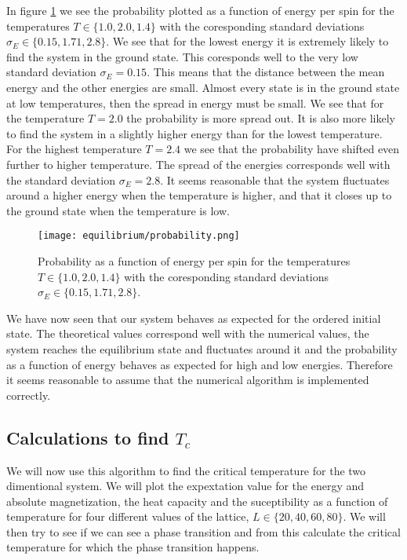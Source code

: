 \documentclass[11pt,a4wide]{article}
\begin{document}
In figure \ref{fig:  probability} we see the probability plotted as a function of energy per spin for the temperatures $T\in \{1.0, 2.0, 1.4\}$ with the coresponding standard deviations $\sigma_E \in \{0.15, 1.71, 2.8 \}$. We see that for the lowest energy it is extremely likely to find the system in the ground state. This coresponds well to the very low standard deviation $\sigma_E = 0.15$. This means that the distance between the mean energy and the other energies are small. Almost every state is in the ground state at low temperatures, then the spread in energy must be small. We see that for the temperature $T=2.0$ the probability is more spread out. It is also more likely to find the system in a slightly higher energy than for the lowest temperature. For the highest temperature $T=2.4$ we see that the probability have shifted even further to higher temperature. The spread of the energies corresponds well with the standard deviation $\sigma_E = 2.8$. It seems reasonable that the system fluctuates around a higher energy when the temperature is higher, and that it closes up to the ground state when the temperature is low. 

\begin{figure}[htp]
\texttt{[image: equilibrium/probability.png]}
\caption{Probability as a function of energy per spin for the temperatures $T\in \{1.0, 2.0, 1.4\}$ with the coresponding standard deviations $\sigma_E \in \{0.15, 1.71, 2.8 \}$. }
\centering
\label{fig:  probability}
\end{figure}

We have now seen that our system behaves as expected for the ordered initial state. The theoretical values correspond well with the numerical values, the system reaches the equilibrium state and fluctuates around it and the probability as a function of energy behaves as expected for high and low energies. Therefore it seems reasonable to assume that the numerical algorithm is implemented correctly. 

\subsection{Calculations to find $T_c$}
We will now use this algorithm to find the critical temperature for the two dimentional system. We will plot the expextation value for the energy and absolute magnetization, the heat capacity and the suceptibility as a function of temperature for four different values of the lattice, $L\in \{20, 40, 60, 80\}$. We will then try to see if we can see a phase transition and from this calculate the critical temperature for which the phase transition happens. 
\end{document}
